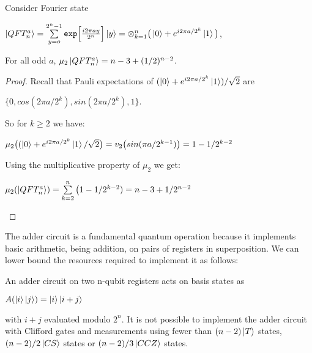 \documentclass[12pt]{dalthesis}
\begin{document}
\begin{proposition}
Consider Fourier state
\begin{center}
$\ket{QFT_n^a} = \sum\limits_{y=o}^{2^n-1} \texttt{exp}\Big[ \frac{i2\pi ay}{2^n} \Big] \ket{y} = \otimes_{k=1}^n \big( \ket{0} + e^{i2\pi a/2^k}\ket{1}\big)$,
\end{center}
For all odd $a$, $\mu_2\ket{QFT_n^a} = n-3 +(1/2)^{n-2}$.
\end{proposition}
\begin{proof}
Recall that Pauli expectations of $(\ket{0} + e^{i2\pi a/2^k}\ket{1})/\sqrt{2}$ are
\begin{center}
$\{ 0, cos(2\pi a/2^k), sin(2\pi a/2^k), 1 \}$.
\end{center}
So for $k \geq 2$ we have:
\begin{center}
$\mu_2 \big( (\ket{0} + e^{i2\pi a/2^k} \ket{1}/\sqrt{2} \big) = v_2 \big( sin(\pi a/2^{k-1}) \big) = 1 - 1/2^{k-2}$
\end{center}
Using the multiplicative property of $\mu_2$ we get:
\begin{center}
$\mu_2 (\ket{QFT_n^a}) = \sum\limits_{k=2}^n \big( 1-1/2^{k-2}) = n-3 + 1/2^{n-2}$
\end{center}
\end{proof}

The adder circuit is a fundamental quantum operation because it implements basic arithmetic, being addition, on pairs of registers in superposition. We can lower bound the resources required to implement it as follows:

\begin{proposition}
An adder circuit on two n-qubit registers acts on basis states as 
\begin{center}
$A(\ket{i} \ket{j}) = \ket{i} \ket{i+j}$
\end{center}
with $i + j$ evaluated modulo $2^n$. It is not possible to implement the adder circuit with Clifford gates and measurements using fewer than $(n-2) \ket{T}$ states, $(n-2)/2 \ket{CS}$ states or $(n-2)/3 \ket{CCZ}$ states.
\end{proposition}
\end{document}
